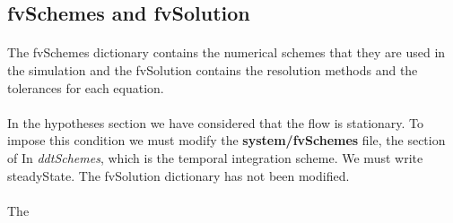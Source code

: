 \subsection{fvSchemes and fvSolution}
\paragraph{}
The fvSchemes dictionary contains the numerical schemes that they are used in the simulation and the fvSolution contains the resolution methods and the tolerances for each equation.

\paragraph{}
In the hypotheses section we have considered that the flow is stationary. To impose this condition we must modify the \textbf{system/fvSchemes} file, the section of In \textit{ ddtSchemes}, which is the temporal integration scheme. We must write steadyState. The fvSolution dictionary has not been modified.

\paragraph{}
The


